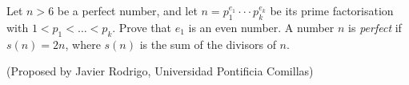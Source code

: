 Let $n>6$ be a perfect number, and let $n=p_1^{e_1}\cdot\cdot\cdot p_k^{e_k}$ be its prime factorisation with $1<p_1<\dots <p_k$. Prove that $e_1$ is an even number.
A number $n$ is \textit{perfect} if $s(n)=2n$, where $s(n)$ is the sum of the divisors of $n$.

(Proposed by Javier Rodrigo, Universidad Pontificia Comillas)